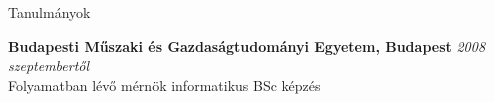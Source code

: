\documentclass{resume} %
\begin{document}

\begin{rSection}{Tanulmányok}

{\bf Budapesti Műszaki és Gazdaságtudományi Egyetem, Budapest} \hfill {\em 2008 szeptembertől} \\
Folyamatban lévő mérnök informatikus BSc képzés \smallskip \\
\end{rSection}

\end{document}
